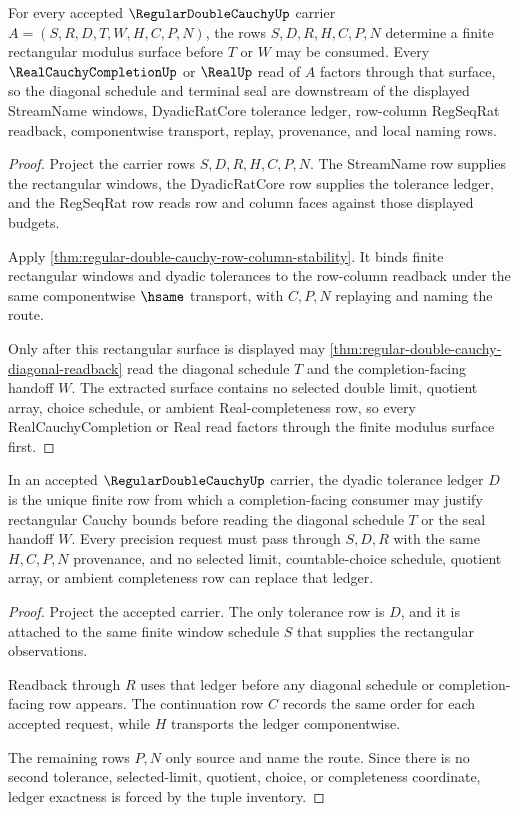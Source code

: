 \begin{theorem}
\label{thm:regular-double-cauchy-rectangular-modulus-extraction}
For every accepted $\RegularDoubleCauchyUp$ carrier $A=(S,R,D,T,W,H,C,P,N)$, the rows $S,D,R,H,C,P,N$ determine a finite rectangular modulus surface before $T$ or $W$ may be consumed. Every $\RealCauchyCompletionUp$ or $\RealUp$ read of $A$ factors through that surface, so the diagonal schedule and terminal seal are downstream of the displayed StreamName windows, DyadicRatCore tolerance ledger, row-column RegSeqRat readback, componentwise transport, replay, provenance, and local naming rows.
\end{theorem}
\begin{proof}
Project the carrier rows $S,D,R,H,C,P,N$. The StreamName row supplies the rectangular windows, the DyadicRatCore row supplies the tolerance ledger, and the RegSeqRat row reads row and column faces against those displayed budgets.

Apply \autoref{thm:regular-double-cauchy-row-column-stability}. It binds finite rectangular windows and dyadic tolerances to the row-column readback under the same componentwise $\hsame$ transport, with $C,P,N$ replaying and naming the route.

Only after this rectangular surface is displayed may \autoref{thm:regular-double-cauchy-diagonal-readback} read the diagonal schedule $T$ and the completion-facing handoff $W$. The extracted surface contains no selected double limit, quotient array, choice schedule, or ambient Real-completeness row, so every RealCauchyCompletion or Real read factors through the finite modulus surface first.
\end{proof}

\begin{theorem}
\label{thm:regular-double-cauchy-ledger-exactness}
In an accepted $\RegularDoubleCauchyUp$ carrier, the dyadic tolerance ledger $D$ is the unique finite row from which a completion-facing consumer may justify rectangular Cauchy bounds before reading the diagonal schedule $T$ or the seal handoff $W$. Every precision request must pass through $S,D,R$ with the same $H,C,P,N$ provenance, and no selected limit, countable-choice schedule, quotient array, or ambient completeness row can replace that ledger.
\end{theorem}
\begin{proof}
Project the accepted carrier. The only tolerance row is $D$, and it is attached to the same finite window schedule $S$ that supplies the rectangular observations.

Readback through $R$ uses that ledger before any diagonal schedule or completion-facing row appears. The continuation row $C$ records the same order for each accepted request, while $H$ transports the ledger componentwise.

The remaining rows $P,N$ only source and name the route. Since there is no second tolerance, selected-limit, quotient, choice, or completeness coordinate, ledger exactness is forced by the tuple inventory.
\end{proof}

